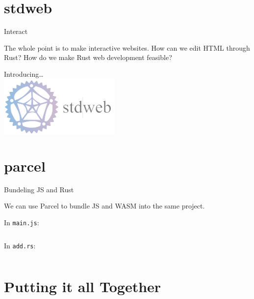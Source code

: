 \documentclass{lug}
\begin{document}
\renewcommand{\secimage}{graphics/stdweb_logo}
\section{stdweb}

\begin{frame}{Interact}

    The whole point is to make interactive websites. How can we edit HTML
    through Rust? How do we make Rust web development feasible?

    \vspace{1cm}

    \begin{center}
        Introducing\dots\\
        \vspace{0.2cm}
        \includegraphics[height=3cm]{graphics/stdweb.png}
    \end{center}
    
\end{frame}

\renewcommand{\secimage}{graphics/parcel_logo}
\section{parcel}

\begin{frame}{Bundeling JS and Rust}

We can use Parcel to bundle JS and WASM into the same project.

In \texttt{main.js}:

\inputminted[fontsize=\footnotesize]{js}{code/add.js}

In \texttt{add.rs}:

\inputminted[fontsize=\footnotesize]{rust}{code/add.rs}

\end{frame}

\renewcommand{\secimage}{graphics/together}
\section{Putting it all Together}
\end{document}

